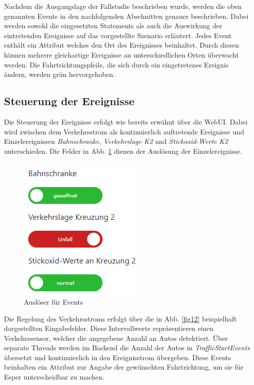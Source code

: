 Nachdem die Ausgangslage der Fallstudie beschrieben wurde, werden die oben genannten Events in den nachfolgenden Abschnitten genauer beschrieben. Dabei werden sowohl die eingesetzten Statements als auch die Auswirkung der eintretenden Ereignisse auf das vorgestellte Szenario erläutert. Jedes Event enthält ein Attribut welches den Ort des Ereignisses beinhaltet. Durch diesen können mehrere gleichartige Ereignisse an unterschiedlichen Orten überwacht werden. Die Fahrtrichtungspfeile, die sich durch ein eingetretenes Ereignis ändern, werden grün hervorgehoben.

\subsection{Steuerung der Ereignisse}
Die Steuerung der Ereignisse erfolgt wie bereits erwähnt über die WebUI. Dabei wird zwischen dem Verkehrsstrom als kontinuierlich auftretende Ereignisse und Einzelereignissen \textit{Bahnschranke}, \textit{Verkehrslage K2} und \textit{Stickoxid-Werte K2} unterschieden. Die Felder in Abb. \ref{fig5} dienen der Auslösung der Einzelereignisse.

\begin{figure}[ht]
\begin{center}
	\includegraphics[scale=0.7]{images/EventTrigger.png}
	\caption{Auslöser für Events}
	\label{fig5}
\end{center}
\end{figure}

Die Regelung des Verkehrsstroms erfolgt über die in Abb. \ref{fig12} beispielhaft dargestellten Eingabefelder. Diese Intervallwerte repräsentieren einen Verkehrssensor, welcher die angegebene Anzahl an Autos detektiert. Über separate Threads werden im Backend die Anzahl der Autos in \textit{TrafficStartEvents} übersetzt und kontinuierlich in den Ereignisstrom übergeben. Diese Events beinhalten ein Attribut zur Angabe der gewünschten Fahrtrichtung, um sie für Esper unterscheidbar zu machen.


